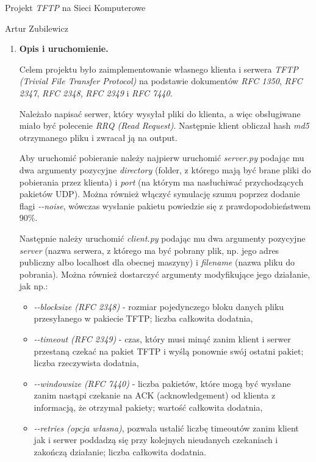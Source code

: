 \documentclass{report}
\begin{document}
\begin{center}
{\Large Projekt \textit{TFTP} na Sieci Komputerowe}

Artur Zubilewicz
\end{center}

\begin{enumerate}
\item \textbf{Opis i uruchomienie.}

Celem projektu było zaimplementowanie własnego klienta i serwera \textit{TFTP (Trivial File Transfer Protocol)} na podstawie dokumentów \textit{RFC 1350}, \textit{RFC 2347}, \textit{RFC 2348}, \textit{RFC 2349} i \textit{RFC 7440}.

Należało napisać serwer, który wysyłał pliki do klienta, a więc obsługiwane miało być polecenie \textit{RRQ (Read Request)}. Następnie klient obliczał hash \textit{md5} otrzymanego pliku i zwracał ją na output.

Aby uruchomić pobieranie należy najpierw uruchomić \textit{server.py} podając mu dwa argumenty pozycyjne \textit{directory} (folder, z którego mają być brane pliki do pobierania przez klienta) i \textit{port} (na którym ma nasłuchiwać przychodzących pakietów UDP). Można również włączyć symulację szumu poprzez dodanie flagi \textit{-{}-noise}, wówczas wysłanie pakietu powiedzie się z prawdopodobieństwem 90\%.

Następnie należy uruchomić \textit{client.py} podając mu dwa argumenty pozycyjne \textit{server} (nazwa serwera, z którego ma być pobrany plik, np. jego adres publiczny albo localhost dla obecnej maszyny) i \textit{filename} (nazwa pliku do pobrania). Można również dostarczyć argumenty modyfikujące jego działanie, jak np.:
\begin{itemize}
\item \textit{-{}-blocksize (RFC 2348)} - rozmiar pojedynczego bloku danych pliku przesyłanego w pakiecie TFTP; liczba całkowita dodatnia,
\item \textit{-{}-timeout (RFC 2349)} - czas, który musi minąć zanim klient i serwer przestaną czekać na pakiet TFTP i wyślą ponownie swój ostatni pakiet; liczba rzeczywista dodatnia,
\item \textit{-{}-windowsize (RFC 7440)} - liczba pakietów, które mogą być wysłane zanim nastąpi czekanie na ACK (acknowledgement) od klienta z informacją, że otrzymał pakiety; wartość całkowita dodatnia,
\item \textit{-{}-retries (opcja własna)}, pozwala ustalić liczbę timeoutów zanim klient jak i serwer poddadzą się przy kolejnych nieudanych czekaniach i zakończą działanie; liczba całkowita dodatnia.
\end{itemize}


\end{enumerate}
\end{document}
